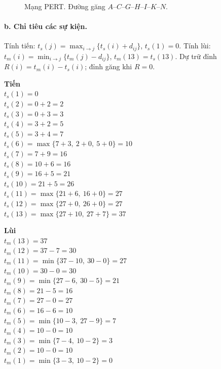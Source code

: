 \documentclass[12pt,a4paper]{article}
\begin{document}
\begin{figure}[H]
{}
\caption{Mạng PERT. Đường găng $A$--$C$--$G$--$H$--$I$--$K$--$N$.}
\end{figure}

\paragraph{b. Chỉ tiêu các sự kiện.}
Tính tiến: $t_s(j)=\max_{i\rightarrow j}\{t_s(i)+d_{ij}\}$, $t_s(1)=0$.
Tính lùi: $t_m(i)=\min_{i\rightarrow j}\{t_m(j)-d_{ij}\}$, $t_m(13)=t_s(13)$.
Dự trữ đỉnh $R(i)=t_m(i)-t_s(i)$; đỉnh găng khi $R=0$.

{\small
\begin{minipage}[t]{0.49\textwidth}
\textbf{Tiến}\\[1pt]
$t_s(1)=0$\\
$t_s(2)=0+2=2$\\
$t_s(3)=0+3=3$\\
$t_s(4)=3+2=5$\\
$t_s(5)=3+4=7$\\
$t_s(6)=\max\{7+3,\ 2+0,\ 5+0\}=10$\\
$t_s(7)=7+9=16$\\
$t_s(8)=10+6=16$\\
$t_s(9)=16+5=21$\\
$t_s(10)=21+5=26$\\
$t_s(11)=\max\{21+6,\ 16+0\}=27$\\
$t_s(12)=\max\{27+0,\ 26+0\}=27$\\
$t_s(13)=\max\{27+10,\ 27+7\}=37$
\end{minipage}
\hfill
\begin{minipage}[t]{0.49\textwidth}
\textbf{Lùi}\\[1pt]
$t_m(13)=37$\\
$t_m(12)=37-7=30$\\
$t_m(11)=\min\{37-10,\ 30-0\}=27$\\
$t_m(10)=30-0=30$\\
$t_m(9)=\min\{27-6,\ 30-5\}=21$\\
$t_m(8)=21-5=16$\\
$t_m(7)=27-0=27$\\
$t_m(6)=16-6=10$\\
$t_m(5)=\min\{10-3,\ 27-9\}=7$\\
$t_m(4)=10-0=10$\\
$t_m(3)=\min\{7-4,\ 10-2\}=3$\\
$t_m(2)=10-0=10$\\
$t_m(1)=\min\{3-3,\ 10-2\}=0$
\end{minipage}
}
\end{document}
